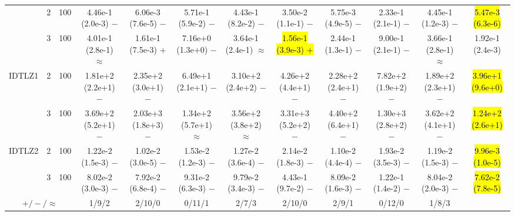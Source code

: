 \begin{table}
{\begin{tabular}{cccccccccccc}
& 2 & 100
& 4.46e-1 (2.0e-3) $-$
& 6.06e-3 (7.6e-5) $-$
& 5.71e-1 (5.9e-2) $-$
& 4.43e-1 (8.2e-2) $-$
& 3.50e-2 (1.1e-1) $-$
& 5.75e-3 (4.9e-5) $-$
& 2.33e-1 (2.1e-1) $-$
& 4.45e-1 (1.2e-3) $-$
& \hl{5.47e-3 (6.3e-6)} \\

& 3 & 100
& 4.01e-1 (2.8e-1) $\approx$
& 1.61e-1 (7.5e-3) $+$
& 7.16e+0 (1.3e+0) $-$
& 3.64e-1 (2.4e-1) $\approx$
& \hl{1.56e-1 (3.9e-3) $+$}
& 2.44e-1 (1.3e-1) $-$
& 9.00e-1 (2.1e-1) $-$
& 3.66e-1 (2.8e-1) $\approx$
& 1.92e-1 (2.4e-3) \\

\midrule

\multirow{2}{*}{IDTLZ1}
& 2 & 100
& 1.81e+2 (2.2e+1) $-$
& 2.35e+2 (3.0e+1) $-$
& 6.49e+1 (2.1e+1) $-$
& 3.10e+2 (2.4e+2) $-$
& 4.26e+2 (4.4e+1) $-$
& 2.28e+2 (2.4e+1) $-$
& 7.82e+2 (1.9e+2) $-$
& 1.89e+2 (2.3e+1) $-$
& \hl{3.96e+1 (9.6e+0)} \\

& 3 & 100
& 3.69e+2 (5.2e+1) $-$
& 2.03e+3 (1.8e+3) $-$
& 1.34e+2 (5.7e+1) $\approx$
& 3.56e+2 (3.8e+2) $\approx$
& 3.31e+3 (5.2e+2) $-$
& 4.40e+2 (6.4e+1) $-$
& 1.30e+3 (2.8e+2) $-$
& 3.62e+2 (4.1e+1) $-$
& \hl{1.24e+2 (2.6e+1)} \\

\midrule

\multirow{2}{*}{IDTLZ2}
& 2 & 100
& 1.22e-2 (1.5e-3) $-$
& 1.02e-2 (3.0e-5) $-$
& 1.53e-2 (1.2e-3) $-$
& 1.27e-2 (3.6e-4) $-$
& 2.14e-2 (1.8e-3) $-$
& 1.10e-2 (4.4e-4) $-$
& 1.93e-2 (3.5e-3) $-$
& 1.19e-2 (1.5e-3) $-$
& \hl{9.96e-3 (1.0e-5)} \\

& 3 & 100
& 8.02e-2 (3.0e-3) $-$
& 7.92e-2 (6.8e-4) $-$
& 9.31e-2 (6.3e-3) $-$
& 9.79e-2 (3.4e-3) $-$
& 4.43e-1 (9.7e-2) $-$
& 8.09e-2 (1.6e-3) $-$
& 1.22e-1 (1.4e-2) $-$
& 8.04e-2 (2.0e-3) $-$
& \hl{7.62e-2 (7.8e-5)} \\

\midrule
\multicolumn{3}{c}{$+/-/\approx$}
& 1/9/2 & 2/10/0 & 0/11/1 & 2/7/3 & 2/10/0 & 2/9/1 & 0/12/0 & 1/8/3 & \\
\bottomrule
\end{tabular}%
}
\end{table}
